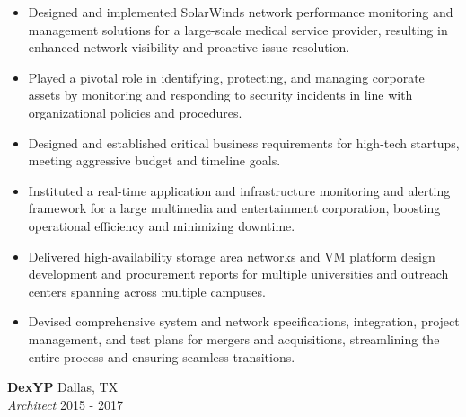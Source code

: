\documentclass[a4paper]{article}
\begin{document}
\begin{itemize} \itemsep 1pt
\item Designed and implemented SolarWinds network performance monitoring and management solutions for a large-scale medical service provider, resulting in enhanced network visibility and proactive issue resolution.
	\item Played a pivotal role in identifying, protecting, and managing corporate assets by monitoring and responding to security incidents in line with organizational policies and procedures.
	\item Designed and established critical business requirements for high-tech startups, meeting aggressive budget and timeline goals.
	\item Instituted a real-time application and infrastructure monitoring and alerting framework for a large multimedia and entertainment corporation, boosting operational efficiency and minimizing downtime.
	\item Delivered high-availability storage area networks and VM platform design development and procurement reports for multiple universities and outreach centers spanning across multiple campuses.
	\item Devised comprehensive system and network specifications, integration, project management, and test plans for mergers and acquisitions, streamlining the entire process and ensuring seamless transitions.
\end{itemize}
\textbf{DexYP} \hfill Dallas, TX\\
\textit{Architect} \hfill 2015 - 2017\\
\vspace{-1mm}
\end{document}
